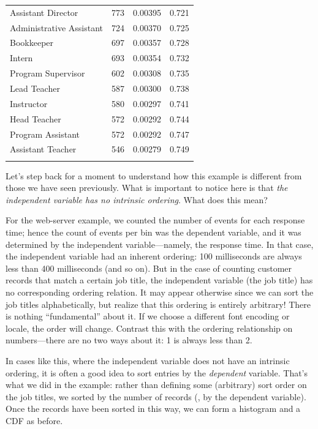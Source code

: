 \begin{table}
{\begin{tabular}{lrrr}
Assistant Director       &    773  &  0.00395   &   0.721 \\
Administrative Assistant &    724  &  0.00370   &   0.725 \\
Bookkeeper               &    697  &  0.00357   &   0.728 \\
Intern                   &    693  &  0.00354   &   0.732 \\
Program Supervisor       &    602  &  0.00308   &   0.735 \\
Lead Teacher             &    587  &  0.00300   &   0.738 \\
Instructor               &    580  &  0.00297   &   0.741 \\
Head Teacher             &    572  &  0.00292   &   0.744 \\
Program Assistant        &    572  &  0.00292   &   0.747 \\
Assistant Teacher        &    546  &  0.00279   &   0.749\\
\botrule
\end{tabular}}
\end{table}

Let's step back for a moment to understand how this example is
different from those we have seen previously. What is important to
notice here is that \emph{the independent variable has no intrinsic
  ordering}. What does this mean?

For the web-server example, we counted the number of events for each
response time; hence the count of events per bin was the dependent
variable, and it was determined by the independent variable---namely,
the response time. In that case, the independent variable had an
inherent ordering: 100 milliseconds are always less than 400
milliseconds (and so on). But in the case of counting customer records
that match a certain job title, the independent variable (the job
title) has no corresponding ordering relation. It may appear otherwise
since we can sort the job titles alphabetically, but realize that this
ordering is entirely arbitrary! There is nothing ``fundamental'' about
it. If we choose a different font encoding or locale, the order will
change.  Contrast this with the ordering relationship on
numbers---there are no two ways about it: 1 is always less than 2.

In cases like this, where the independent variable does not have an
intrinsic ordering, it is often a good idea to sort entries by the
\emph{dependent} variable. That's what we did in the example: rather
than defining some (arbitrary) sort order on the job titles, we sorted
by the number of records (\ie, by the dependent variable). Once the
records have been sorted in this way, we can form a histogram and a
CDF as before.

